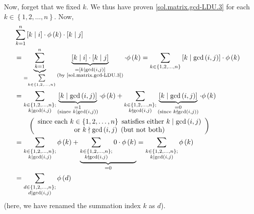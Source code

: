 \documentclass[paper=a4, fontsize=12pt]{scrartcl}%
\let\sumnonlimits\sum
\renewcommand{\sum}{\sumnonlimits\limits}
\theoremstyle{plainsl}
\theoremstyle{definition}
\theoremstyle{remark}
\begin{document}
Now, forget that we fixed $k$. We thus have proven
\eqref{sol.matrix.gcd-LDU.3} for each $k\in\left\{  1,2,\ldots,n\right\}  $.
Now,%
\begin{align}
&  \sum_{k=1}^{n}\left[  k\mid i\right]  \cdot\phi\left(  k\right)
\cdot\left[  k\mid j\right] \nonumber\\
&  =\underbrace{\sum_{k=1}^{n}}_{=\sum_{k\in\left\{  1,2,\ldots,n\right\}  }%
}\underbrace{\left[  k\mid i\right]  \cdot\left[  k\mid j\right]
}_{\substack{=\left[  k\mid\gcd\left(  i,j\right)  \right]  \\\text{(by
\eqref{sol.matrix.gcd-LDU.3})}}}\cdot\phi\left(  k\right)  =\sum_{k\in\left\{
1,2,\ldots,n\right\}  }\left[  k\mid\gcd\left(  i,j\right)  \right]  \cdot
\phi\left(  k\right) \nonumber\\
&  =\sum_{\substack{k\in\left\{  1,2,\ldots,n\right\}  ;\\k\mid\gcd\left(
i,j\right)  }}\underbrace{\left[  k\mid\gcd\left(  i,j\right)  \right]
}_{\substack{=1\\\text{(since }k\mid\gcd\left(  i,j\right)  \text{)}}%
}\cdot\phi\left(  k\right)  +\sum_{\substack{k\in\left\{  1,2,\ldots
,n\right\}  ;\\k\nmid\gcd\left(  i,j\right)  }}\underbrace{\left[  k\mid
\gcd\left(  i,j\right)  \right]  }_{\substack{=0\\\text{(since }k\nmid
\gcd\left(  i,j\right)  \text{)}}}\cdot\phi\left(  k\right) \nonumber\\
&  \qquad\left(
\begin{array}
[c]{c}%
\text{since each }k\in\left\{  1,2,\ldots,n\right\}  \text{ satisfies either
}k\mid\gcd\left(  i,j\right) \\
\text{or }k\nmid\gcd\left(  i,j\right)  \text{ (but not both)}%
\end{array}
\right) \nonumber\\
&  =\sum_{\substack{k\in\left\{  1,2,\ldots,n\right\}  ;\\k\mid\gcd\left(
i,j\right)  }}\phi\left(  k\right)  +\underbrace{\sum_{\substack{k\in\left\{
1,2,\ldots,n\right\}  ;\\k\nmid\gcd\left(  i,j\right)  }}0\cdot\phi\left(
k\right)  }_{=0}=\sum_{\substack{k\in\left\{  1,2,\ldots,n\right\}
;\\k\mid\gcd\left(  i,j\right)  }}\phi\left(  k\right) \nonumber\\
&  =\sum_{\substack{d\in\left\{  1,2,\ldots,n\right\}  ;\\d\mid\gcd\left(
i,j\right)  }}\phi\left(  d\right)  \label{sol.matrix.gcd-LDU.5}%
\end{align}
(here, we have renamed the summation index $k$ as $d$).
\end{document}
